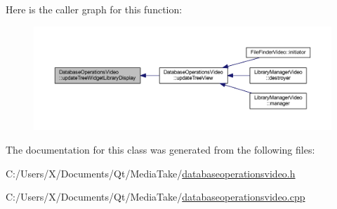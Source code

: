 Here is the caller graph for this function\-:
\nopagebreak
\begin{figure}[H]
\begin{center}
\leavevmode
\includegraphics[width=350pt]{class_database_operations_video_a0dd4f0a7c0fb2db04227435dac72651d_icgraph}
\end{center}
\end{figure}




The documentation for this class was generated from the following files\-:\begin{DoxyCompactItemize}
\item 
C\-:/\-Users/\-X/\-Documents/\-Qt/\-Media\-Take/\hyperlink{databaseoperationsvideo_8h}{databaseoperationsvideo.\-h}\item 
C\-:/\-Users/\-X/\-Documents/\-Qt/\-Media\-Take/\hyperlink{databaseoperationsvideo_8cpp}{databaseoperationsvideo.\-cpp}\end{DoxyCompactItemize}
